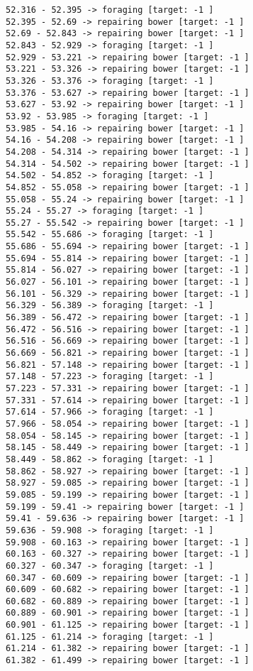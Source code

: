 \documentclass[11pt]{article}
\begin{document}
\begin{Verbatim}[commandchars=\\\{\}]
52.316 - 52.395 -> foraging [target: -1 ]
52.395 - 52.69 -> repairing bower [target: -1 ]
52.69 - 52.843 -> repairing bower [target: -1 ]
52.843 - 52.929 -> foraging [target: -1 ]
52.929 - 53.221 -> repairing bower [target: -1 ]
53.221 - 53.326 -> repairing bower [target: -1 ]
53.326 - 53.376 -> foraging [target: -1 ]
53.376 - 53.627 -> repairing bower [target: -1 ]
53.627 - 53.92 -> repairing bower [target: -1 ]
53.92 - 53.985 -> foraging [target: -1 ]
53.985 - 54.16 -> repairing bower [target: -1 ]
54.16 - 54.208 -> repairing bower [target: -1 ]
54.208 - 54.314 -> repairing bower [target: -1 ]
54.314 - 54.502 -> repairing bower [target: -1 ]
54.502 - 54.852 -> foraging [target: -1 ]
54.852 - 55.058 -> repairing bower [target: -1 ]
55.058 - 55.24 -> repairing bower [target: -1 ]
55.24 - 55.27 -> foraging [target: -1 ]
55.27 - 55.542 -> repairing bower [target: -1 ]
55.542 - 55.686 -> foraging [target: -1 ]
55.686 - 55.694 -> repairing bower [target: -1 ]
55.694 - 55.814 -> repairing bower [target: -1 ]
55.814 - 56.027 -> repairing bower [target: -1 ]
56.027 - 56.101 -> repairing bower [target: -1 ]
56.101 - 56.329 -> repairing bower [target: -1 ]
56.329 - 56.389 -> foraging [target: -1 ]
56.389 - 56.472 -> repairing bower [target: -1 ]
56.472 - 56.516 -> repairing bower [target: -1 ]
56.516 - 56.669 -> repairing bower [target: -1 ]
56.669 - 56.821 -> repairing bower [target: -1 ]
56.821 - 57.148 -> repairing bower [target: -1 ]
57.148 - 57.223 -> foraging [target: -1 ]
57.223 - 57.331 -> repairing bower [target: -1 ]
57.331 - 57.614 -> repairing bower [target: -1 ]
57.614 - 57.966 -> foraging [target: -1 ]
57.966 - 58.054 -> repairing bower [target: -1 ]
58.054 - 58.145 -> repairing bower [target: -1 ]
58.145 - 58.449 -> repairing bower [target: -1 ]
58.449 - 58.862 -> foraging [target: -1 ]
58.862 - 58.927 -> repairing bower [target: -1 ]
58.927 - 59.085 -> repairing bower [target: -1 ]
59.085 - 59.199 -> repairing bower [target: -1 ]
59.199 - 59.41 -> repairing bower [target: -1 ]
59.41 - 59.636 -> repairing bower [target: -1 ]
59.636 - 59.908 -> foraging [target: -1 ]
59.908 - 60.163 -> repairing bower [target: -1 ]
60.163 - 60.327 -> repairing bower [target: -1 ]
60.327 - 60.347 -> foraging [target: -1 ]
60.347 - 60.609 -> repairing bower [target: -1 ]
60.609 - 60.682 -> repairing bower [target: -1 ]
60.682 - 60.889 -> repairing bower [target: -1 ]
60.889 - 60.901 -> repairing bower [target: -1 ]
60.901 - 61.125 -> repairing bower [target: -1 ]
61.125 - 61.214 -> foraging [target: -1 ]
61.214 - 61.382 -> repairing bower [target: -1 ]
61.382 - 61.499 -> repairing bower [target: -1 ]

\end{Verbatim}
\end{document}
